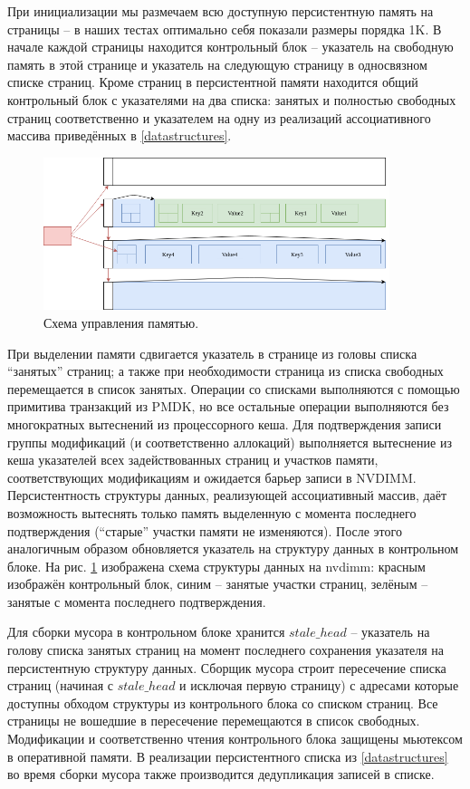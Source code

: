 \documentclass[pdftex,ptm,12pt,a4paper]{report}
\theoremstyle{definition}
\begin{document}
При инициализации мы размечаем всю доступную персистентную память на страницы -- в наших тестах оптимально себя показали размеры порядка 1K.
В начале каждой страницы находится контрольный блок -- указатель на свободную память в этой странице и указатель на следующую страницу в односвязном списке страниц.
Кроме страниц в персистентной памяти находится общий контрольный блок с указателями на два списка: занятых и полностью свободных страниц соответственно и
указателем на одну из реализаций ассоциативного массива приведённых в \ref{datastructures}.

\begin{figure}[h]
\centering
\includegraphics[width=0.9\textwidth]{pages.png}
\caption{Схема управления памятью.}
\label{mempic}
\end{figure}

При выделении памяти сдвигается указатель в странице из головы списка ``занятых'' страниц; а также при необходимости страница из списка свободных перемещается в список занятых.
Операции со списками выполняются с помощью примитива транзакций из PMDK, но все остальные операции выполняются без многократных вытеснений из процессорного кеша.
Для подтверждения записи группы модификаций (и соответственно аллокаций) выполняется вытеснение из кеша указателей всех задействованных страниц и участков памяти,
соответствующих модификациям и ожидается барьер записи в NVDIMM. Персистентность структуры данных, реализующей ассоциативный массив, даёт возможность вытеснять только память выделенную
с момента последнего подтверждения (``старые'' участки памяти не изменяются).
После этого аналогичным образом обновляется указатель на структуру данных в контрольном блоке.
На рис. \ref{mempic} изображена схема структуры данных на nvdimm: красным изображён контрольный блок, синим -- занятые участки страниц, зелёным -- занятые с момента последнего
подтверждения.
 
Для сборки мусора в контрольном блоке хранится $stale\_head$ -- указатель на голову списка занятых страниц на момент последнего сохранения указателя на персистентную структуру данных.
Сборщик мусора строит пересечение списка страниц (начиная с $stale\_head$ и исключая первую страницу) с адресами которые доступны обходом структуры из контрольного блока со списком страниц.
Все страницы не вошедшие в пересечение перемещаются в список свободных. Модификации и соответственно чтения контрольного блока защищены мьютексом в оперативной памяти.
В реализации персистентного списка из \ref{datastructures} во время сборки мусора также производится дедупликация записей в списке.
\end{document}
